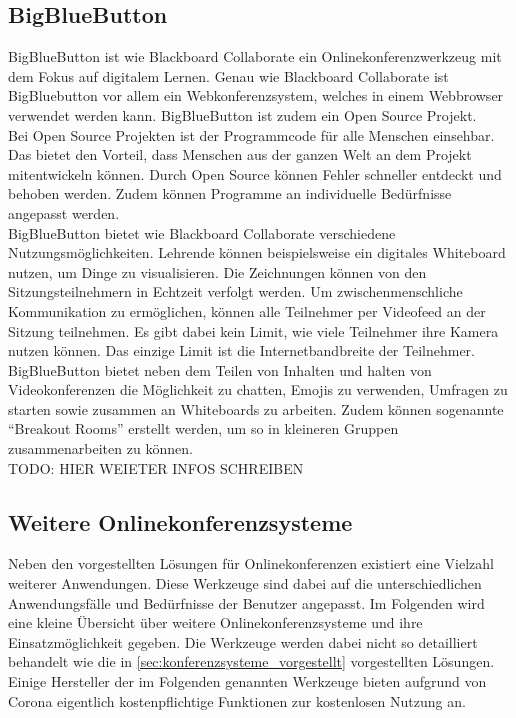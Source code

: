 \subsection{BigBlueButton}
BigBlueButton ist wie Blackboard Collaborate ein Onlinekonferenzwerkzeug mit dem Fokus auf digitalem Lernen.
Genau wie Blackboard Collaborate ist BigBluebutton vor allem ein Webkonferenzsystem, welches in einem Webbrowser verwendet werden kann.
BigBlueButton ist zudem ein Open Source Projekt.
\autocite[Vgl.][]{M_BigBlueButton.o.J.b}
\\
Bei Open Source Projekten ist der Programmcode für alle Menschen einsehbar.
Das bietet den Vorteil, dass Menschen aus der ganzen Welt an dem Projekt mitentwickeln können.
Durch Open Source können Fehler schneller entdeckt und behoben werden.
Zudem können Programme an individuelle Bedürfnisse angepasst werden.
\autocite[Vgl.][]{M_RedHat.o.J.}
\\
BigBlueButton bietet wie Blackboard Collaborate verschiedene Nutzungsmöglichkeiten.
Lehrende können beispielsweise ein digitales Whiteboard nutzen, um Dinge zu visualisieren.
Die Zeichnungen können von den Sitzungsteilnehmern in Echtzeit verfolgt werden.
Um zwischenmenschliche Kommunikation zu ermöglichen, können alle Teilnehmer per Videofeed an der Sitzung teilnehmen.
Es gibt dabei kein Limit, wie viele Teilnehmer ihre Kamera nutzen können.
Das einzige Limit ist die Internetbandbreite der Teilnehmer.
\autocite[Vgl.][]{M_BigBlueButton.o.J.}
\\
BigBlueButton bietet neben dem Teilen von Inhalten und halten von Videokonferenzen die Möglichkeit zu chatten, Emojis zu verwenden, Umfragen zu starten sowie zusammen an Whiteboards zu arbeiten.
Zudem können sogenannte \enquote{Breakout Rooms} erstellt werden, um so in kleineren Gruppen zusammenarbeiten zu können.
\autocite[Vgl.][]{M_BigBlueButton.o.J.}
\\
TODO: HIER WEIETER INFOS SCHREIBEN

\subsection{Weitere Onlinekonferenzsysteme}
Neben den vorgestellten Lösungen für Onlinekonferenzen existiert eine Vielzahl weiterer Anwendungen.
Diese Werkzeuge sind dabei auf die unterschiedlichen Anwendungsfälle und Bedürfnisse der Benutzer angepasst.
Im Folgenden wird eine kleine Übersicht über weitere Onlinekonferenzsysteme und ihre Einsatzmöglichkeit gegeben.
Die Werkzeuge werden dabei nicht so detailliert behandelt wie die in \autoref{sec:konferenzsysteme_vorgestellt} vorgestellten Lösungen.
\\
Einige Hersteller der im Folgenden genannten Werkzeuge bieten aufgrund von Corona eigentlich kostenpflichtige Funktionen zur kostenlosen Nutzung an.
\autocite[Vgl.][]{M_Straub.o.J.}

